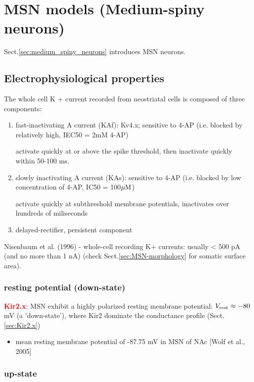 \chapter{MSN models (Medium-spiny neurons)}
\label{chap:MSN-models}

Sect.\ref{sec:medium_spiny_neurons} introduces MSN neurons.

\section{Electrophysiological properties}

The whole cell K + current recorded from neostriatal
cells is composed of three components:
\begin{enumerate}
  \item fast-inactivating A current (KAf): Kv4.x; sensitive to 4-AP (i.e.
  blocked by relatively high, IEC50 = 2mM 4-AP)
  
 activate quickly at or above the spike threshold, then inactivate quickly
 within 50-100 ms. 
  
  
  \item slowly inactivating A current (KAs): sensitive to 4-AP (i.e. blocked by
  low concentration of 4-AP, IC50 = 100${\mu\text{M}}$)
  
 activate quickly at subthreshold membrane potentials, inactivates over 
 hundreds of miliseconds
  
  \item delayed-rectifier, persistent component 
\end{enumerate}

Nisenbaum et al. (1996) - whole-cell recording K+ currents: usually < 500 pA
(and no more than 1 nA) (check Sect.\ref{sec:MSN-morphology} for somatic surface
area).

\subsection{resting potential (down-state)}


\textcolor{red}{\bf Kir2.x}:
MSN exhibit a highly polarized resting membrane potential:
$V_{\text{rest}} \approx -80 $mV (a 'down-state'), where Kir2 dominate the conductance
profile (Sect.\ref{sec:Kir2.x})
\begin{itemize}
  \item  mean resting membrane potential of -87.75 mV in MSN of NAc [Wolf et
  al., 2005]
\end{itemize}

\subsection{up-state}

